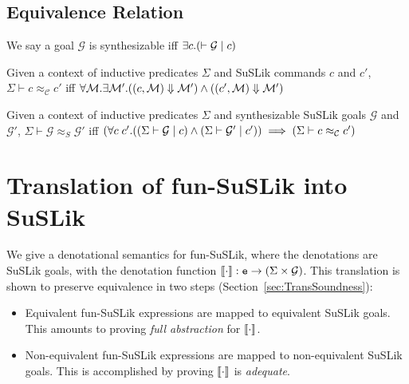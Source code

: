 \documentclass[10pt]{article}
\begin{document}
\subsection{Equivalence Relation}
\label{sec:SuSLikEquiv}

\begin{definition}[Synthesizability]
  We say a goal $\mathcal{G}$ is \textnormal{synthesizable} iff $\exists c. (\vdash \mathcal{G}\;|\; c)$
\end{definition}

\begin{definition}
  Given a context of inductive predicates $\Sigma$ and SuSLik commands $c$ and $c'$, $\Sigma \vdash c \approx_\mathcal{C} c'$ iff
    $\forall \mathcal{M}. \exists \mathcal{M'}.
      ((c, \mathcal{M}) \Downarrow \mathcal{M'})
      \land
      ((c', \mathcal{M}) \Downarrow \mathcal{M'})$
\end{definition}

\begin{definition}
  Given a context of inductive predicates $\Sigma$ and synthesizable SuSLik goals $\mathcal{G}$ and $\mathcal{G}'$, $\Sigma \vdash \mathcal{G} \approx_{S} \mathcal{G}'$ iff
    $(\forall c\; c'. ((\Sigma \vdash \mathcal{G} \;|\; c) \land (\Sigma \vdash \mathcal{G}' \;|\; c')) \implies (\Sigma \vdash c \approx_{\mathcal{C}} c')$
\end{definition}

\section{Translation of fun-SuSLik into SuSLik}
\label{sec:Translation}

We give a denotational semantics for fun-SuSLik, where the denotations are SuSLik goals, with
the denotation function $\llbracket\cdot\rrbracket : \texttt{e} \rightarrow (\Sigma \times \mathcal{G})$.
This translation is shown to preserve equivalence in two steps (Section~\ref{sec:TransSoundness}):

\begin{itemize}
  \item Equivalent fun-SuSLik expressions are mapped to equivalent SuSLik goals. This amounts to proving
    \textit{full abstraction} for $\llbracket\cdot\rrbracket$.
  \item Non-equivalent fun-SuSLik expressions are mapped to non-equivalent SuSLik goals.
    This is accomplished by proving $\llbracket\cdot\rrbracket$ is \textit{adequate}.
\end{itemize}
\end{document}
